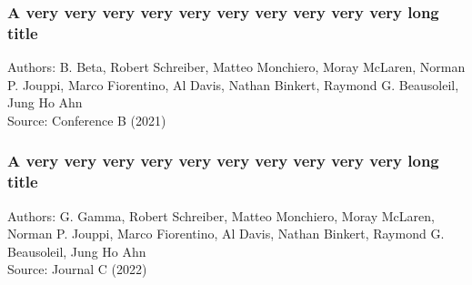 \documentclass[../template.tex]{subfiles}
\begin{document}
\blindtext

\subsubsection{A very very very very very very very very very very long title \texorpdfstring{\hyperref[tab:literature]{\footnotesize \hfill{}}}{}}
\label{lit:labelOfYourSubsubsection2}		%
{
	\tiny
	Authors: B. Beta, Robert Schreiber, Matteo Monchiero, Moray McLaren, Norman P. Jouppi, Marco Fiorentino, Al Davis, Nathan Binkert, Raymond G. Beausoleil, Jung Ho Ahn \cite{B}\\
	Source: Conference B (2021)
	\par  %
}

\blindtext



\subsubsection{A very very very very very very very very very very long title \texorpdfstring{\hyperref[tab:literature]{\footnotesize \hfill{}}}{}}
\label{lit:labelOfYourSubsubsection3}		%
{
	\tiny
	Authors: G. Gamma, Robert Schreiber, Matteo Monchiero, Moray McLaren, Norman P. Jouppi, Marco Fiorentino, Al Davis, Nathan Binkert, Raymond G. Beausoleil, Jung Ho Ahn \cite{G}\\
	Source: Journal C (2022)
	\par  %
}

\blindtext

\end{document}

